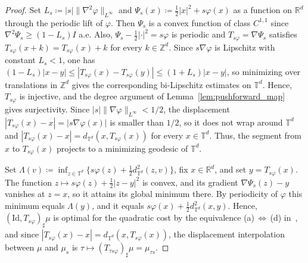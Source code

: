 \documentclass[11pt]{article}
\numberwithin{equation}{section}
\theoremstyle{definition}
\newcommand{\R}{\mathbb{R}}
\newcommand{\T}{\mathbb{T}}
\begin{document}
\begin{proof}
    Set $L_s \coloneqq |s| \|\nabla^2\varphi\|_{L^\infty}$ and $\Psi_s(x) \coloneqq \frac{1}{2}|x|^2 + s\varphi(x)$ as a function on $\R^d$ through the periodic lift of $\varphi$.
    Then $\Psi_s$ is a convex function of class $C^{1,1}$ since $\nabla^2 \Psi_s \ge (1-L_s)I$ a.e.
    Also, $\Psi_s - \frac{1}{2}|\cdot|^2 = s\varphi$ is periodic and $T_{s\varphi} = \nabla\Psi_s$ satisfies $T_{s\varphi}(x + k) = T_{s\varphi}(x) + k$ for every $k \in \mathbb{Z}^d$.
    Since $s\nabla\varphi$ is Lipschitz with constant $L_s < 1$, one has $(1-L_s) |x - y| \le |T_{s\varphi}(x) - T_{s\varphi}(y)| \le (1+L_s) |x - y|$, so minimizing over translations in $\mathbb{Z}^d$ gives the corresponding bi-Lipschitz estimates on $\T^d$.
    Hence, $T_{s\varphi}$ is injective, and the degree argument of Lemma~\ref{lem:pushforward_map} gives surjectivity. 
    Since $|s| \|\nabla\varphi\|_{L^\infty} < 1/2$, the displacement $|T_{s\varphi}(x) - x| = |s \nabla\varphi(x)|$ is smaller than $1/2$, so it does not wrap around $\T^d$ and $|T_{s\varphi}(x) - x| = d_{\T^d}(x, T_{s\varphi}(x))$ for every $x \in \T^d$.
    Thus, the segment from $x$ to $T_{s\varphi}(x)$ projects to a minimizing geodesic of $\T^d$.

    Set $\Lambda(v) \coloneqq \inf_{z \in \T^d} \{ s\varphi(z) + \frac{1}{2} d^2_{\T^d}(z,v)\}$, fix $x \in \R^d$, and set $y = T_{s\varphi}(x)$.
    The function $z \mapsto s\varphi(z) + \frac{1}{2}|z-y|^2$ is convex, and its gradient $\nabla \Psi_s(z) - y$ vanishes at $z = x$, so it attains its global minimum there.
    By periodicity of $\varphi$ this minimum equals $\Lambda(y)$, and it equals $s\varphi(x) + \frac{1}{2}d^2_{\T^d}(x,y)$.
    Hence, $(\mathrm{Id}, T_{s\varphi})_\sharp\mu$ is optimal for the quadratic cost by the equivalence (a)$\,\Leftrightarrow\,$(d) in~\cite[Thm.~5.10(ii)]{villani2008optimal}, and since $|T_{s\varphi}(x) - x| = d_{\T^d}(x, T_{s\varphi}(x))$, the displacement interpolation between $\mu$ and $\mu_s$ is $\tau \mapsto (T_{\tau s\varphi})_\sharp\mu = \mu_{\tau s}$.


\end{proof}
\end{document}
